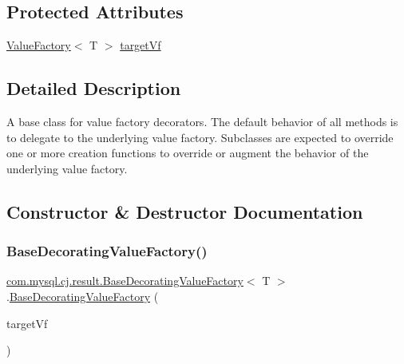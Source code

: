 \subsection*{Protected Attributes}
\begin{DoxyCompactItemize}
\item 
\mbox{\hyperlink{interfacecom_1_1mysql_1_1cj_1_1result_1_1_value_factory}{Value\+Factory}}$<$ T $>$ \mbox{\hyperlink{classcom_1_1mysql_1_1cj_1_1result_1_1_base_decorating_value_factory_a64c2c62bd9906ec3af7fc62e58bf34b3}{target\+Vf}}
\end{DoxyCompactItemize}


\subsection{Detailed Description}
A base class for value factory decorators. The default behavior of all methods is to delegate to the underlying value factory. Subclasses are expected to override one or more creation functions to override or augment the behavior of the underlying value factory. 

\subsection{Constructor \& Destructor Documentation}
\mbox{\label{classcom_1_1mysql_1_1cj_1_1result_1_1_base_decorating_value_factory_adf77416836995015dd8a6f214749b8b4}} 
\subsubsection{\texorpdfstring{Base\+Decorating\+Value\+Factory()}{BaseDecoratingValueFactory()}}
{\footnotesize\ttfamily \mbox{\hyperlink{classcom_1_1mysql_1_1cj_1_1result_1_1_base_decorating_value_factory}{com.\+mysql.\+cj.\+result.\+Base\+Decorating\+Value\+Factory}}$<$ T $>$.\mbox{\hyperlink{classcom_1_1mysql_1_1cj_1_1result_1_1_base_decorating_value_factory}{Base\+Decorating\+Value\+Factory}} (\begin{DoxyParamCaption}\item[{\mbox{\hyperlink{interfacecom_1_1mysql_1_1cj_1_1result_1_1_value_factory}{Value\+Factory}}$<$ T $>$}]{target\+Vf }\end{DoxyParamCaption})}



